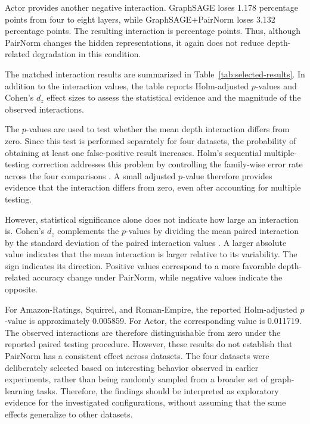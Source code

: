 \documentclass[english]{lni}
\begin{document}
Actor provides another negative interaction. GraphSAGE loses 1.178 percentage points from four to eight layers, while GraphSAGE+PairNorm loses 3.132 percentage points. The resulting interaction is \mbox{} percentage points. Thus, although PairNorm changes the hidden representations, it again  does not reduce depth-related degradation in this condition.

The matched interaction results are summarized in Table~\ref{tab:selected-results}. In addition to the interaction values, the table reports Holm-adjusted $p$-values and Cohen's $d_z$ effect sizes to assess the statistical evidence and the magnitude of the observed interactions.

The $p$-values are used to test whether the mean depth interaction differs from zero. Since this test is performed separately for four datasets, the probability of obtaining at least one false-positive result increases. Holm's sequential multiple-testing correction addresses this problem by controlling the family-wise error rate across the four comparisons \cite{holm1979procedure}. A small adjusted $p$-value therefore provides evidence that the interaction differs from zero, even after accounting for multiple testing.

However, statistical significance alone does not indicate how large an interaction is. Cohen's $d_z$ complements the $p$-values by dividing the mean paired interaction by the standard deviation of the paired interaction values \cite{lakens2013effectsizes}. A larger absolute value indicates that the mean interaction is larger relative to its variability. The sign indicates its direction. Positive values correspond to a more favorable depth-related accuracy change under PairNorm, while negative values indicate the opposite.

For Amazon-Ratings, Squirrel, and Roman-Empire, the reported Holm-adjusted $p$-value is approximately 0.005859. For Actor, the corresponding value is 0.011719. The observed interactions are therefore distinguishable from zero under the reported paired testing procedure. However, these results do not establish that PairNorm has a consistent effect across datasets. The four datasets were deliberately selected based on interesting behavior observed in earlier experiments, rather than being randomly sampled from a broader set of graph-learning tasks. Therefore, the findings should be interpreted as exploratory evidence for the investigated configurations, without assuming that the same effects generalize to other datasets.
\end{document}
